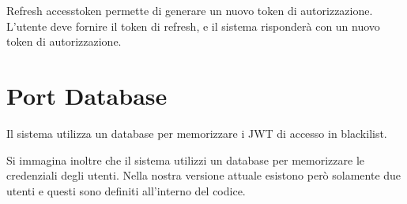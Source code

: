 Refresh accesstoken permette di generare un nuovo token di autorizzazione. L'utente deve fornire il token di refresh, e il sistema risponderà con un nuovo token di autorizzazione.

\section{Port Database}

Il sistema utilizza un database per memorizzare i JWT di accesso in blackilist.

Si immagina inoltre che il sistema utilizzi un database per memorizzare le credenziali degli utenti. Nella nostra versione attuale esistono però solamente due utenti e questi sono definiti all'interno del codice.


